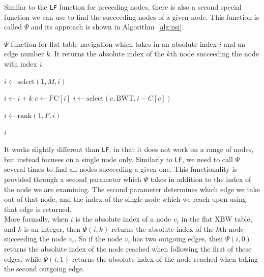 \documentclass[a4paper,12pt,twoside,BCOR=10mm]{scrbook}
\begin{document}
Similar to the \texttt{LF} function for preceding nodes, there is also a second special function we can use
to find the succeeding nodes of a given node.
This function is called $ \Psi $ and its approach is shown in Algorithm~\ref{alg:psi}.
\begin{algorithm}
\caption[$ \Psi $ function for flat table navigation]{$ \Psi $ function for flat table navigation which takes in an absolute index $ i $ and an edge number $ k $. It returns the absolute index of the $ k $th node succeeding the node with index $ i $.}
\label{alg:psi}
\begin{algorithmic}[1]

\State $ i \gets \textrm{select}(1, M, i) $

\State \phantom{nl}

\State $ i \gets i + k $
\State $ c \gets \textrm{FC} [ i ] $
\State $ i \gets \textrm{select}(c, \textrm{BWT}, i - C [ c ]) $

\State \phantom{nl}

\State $ i \gets \textrm{rank}(1, F, i) $

\State \phantom{nl}

\State \Return $ i $

\end{algorithmic}
\end{algorithm}
It works slightly different than \texttt{LF},
in that it does not work on a range of nodes, but instead focuses on a single node only.
Similarly to \texttt{LF}, we need to call $ \Psi $ several times to find all nodes succeeding a given one.
This functionality is provided through a second parameter which $ \Psi $ takes
in addition to the index of the node we are examining.
The second parameter determines which edge we take out of that node,
and the index of the single node which we reach upon using that edge is returned. \\
More formally, when $ i $ is the absolute index of a node $ v_i $ in the flat XBW table,
and $ k $ is an integer, then $ \Psi (i, k) $ returns the absolute index of the $ k $th node
succeeding the node $ v_i $. So if the node $ v_i $ has two outgoing edges,
then $ \Psi (i, 0) $ returns the absolute index of the node reached when following
the first of these edges, while $ \Psi (i, 1) $ returns the absolute index of the node reached when
taking the second outgoing edge. \\
\end{document}
